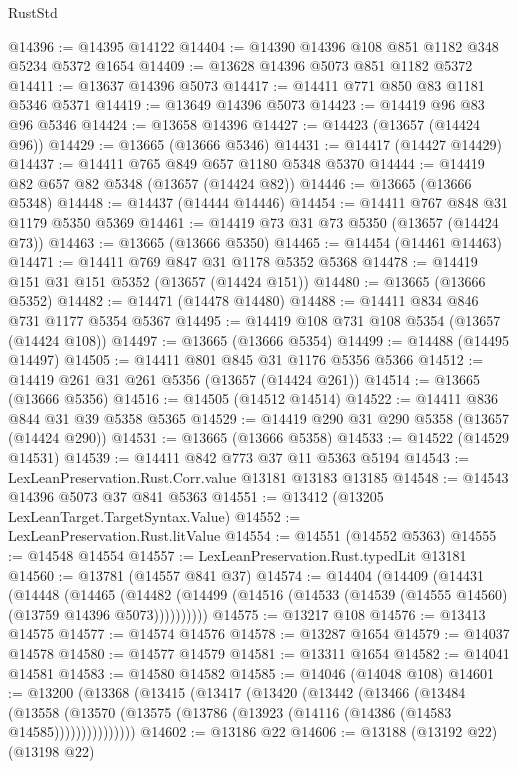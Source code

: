 \begin{lexlean}{RustStd}
\begin{coremodule}
@14396 := @14395 @14122
@14404 := @14390 @14396 @108 @851 @1182 @348 @5234 @5372 @1654
@14409 := @13628 @14396 @5073 @851 @1182 @5372
@14411 := @13637 @14396 @5073
@14417 := @14411 @771 @850 @83 @1181 @5346 @5371
@14419 := @13649 @14396 @5073
@14423 := @14419 @96 @83 @96 @5346
@14424 := @13658 @14396
@14427 := @14423 (@13657 (@14424 @96))
@14429 := @13665 (@13666 @5346)
@14431 := @14417 (@14427 @14429)
@14437 := @14411 @765 @849 @657 @1180 @5348 @5370
@14444 := @14419 @82 @657 @82 @5348 (@13657 (@14424 @82))
@14446 := @13665 (@13666 @5348)
@14448 := @14437 (@14444 @14446)
@14454 := @14411 @767 @848 @31 @1179 @5350 @5369
@14461 := @14419 @73 @31 @73 @5350 (@13657 (@14424 @73))
@14463 := @13665 (@13666 @5350)
@14465 := @14454 (@14461 @14463)
@14471 := @14411 @769 @847 @31 @1178 @5352 @5368
@14478 := @14419 @151 @31 @151 @5352 (@13657 (@14424 @151))
@14480 := @13665 (@13666 @5352)
@14482 := @14471 (@14478 @14480)
@14488 := @14411 @834 @846 @731 @1177 @5354 @5367
@14495 := @14419 @108 @731 @108 @5354 (@13657 (@14424 @108))
@14497 := @13665 (@13666 @5354)
@14499 := @14488 (@14495 @14497)
@14505 := @14411 @801 @845 @31 @1176 @5356 @5366
@14512 := @14419 @261 @31 @261 @5356 (@13657 (@14424 @261))
@14514 := @13665 (@13666 @5356)
@14516 := @14505 (@14512 @14514)
@14522 := @14411 @836 @844 @31 @39 @5358 @5365
@14529 := @14419 @290 @31 @290 @5358 (@13657 (@14424 @290))
@14531 := @13665 (@13666 @5358)
@14533 := @14522 (@14529 @14531)
@14539 := @14411 @842 @773 @37 @11 @5363 @5194
@14543 := LexLeanPreservation.Rust.Corr.value @13181 @13183 @13185
@14548 := @14543 @14396 @5073 @37 @841 @5363
@14551 := @13412 (@13205 LexLeanTarget.TargetSyntax.Value)
@14552 := LexLeanPreservation.Rust.litValue
@14554 := @14551 (@14552 @5363)
@14555 := @14548 @14554
@14557 := LexLeanPreservation.Rust.typedLit @13181
@14560 := @13781 (@14557 @841 @37)
@14574 := @14404
    (@14409
      (@14431
        (@14448
          (@14465
            (@14482 (@14499 (@14516 (@14533 (@14539 (@14555 @14560) (@13759 @14396 @5073))))))))))
@14575 := @13217 @108
@14576 := @13413 @14575
@14577 := @14574 @14576
@14578 := @13287 @1654
@14579 := @14037 @14578
@14580 := @14577 @14579
@14581 := @13311 @1654
@14582 := @14041 @14581
@14583 := @14580 @14582
@14585 := @14046 (@14048 @108)
@14601 := @13200
    (@13368
      (@13415
        (@13417
          (@13420
            (@13442
              (@13466
                (@13484
                  (@13558
                    (@13570 (@13575 (@13786 (@13923 (@14116 (@14386 (@14583 @14585)))))))))))))))
@14602 := @13186 @22
@14606 := @13188 (@13192 @22) (@13198 @22)

\end{coremodule}
\end{lexlean}
